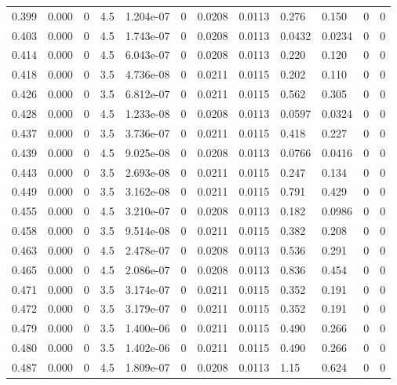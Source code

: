 \documentclass[preview]{standalone}
\begin{document}
{{{\begin{tabular}{L{1.2cm}C{1.2cm} C{0.3cm}C{0.5cm} C{1.4cm}C{1.4cm} C{1.4cm}C{1.4cm} C{1.6cm}C{1.6cm} C{1.6cm}C{1.6cm}}
  0.399  &  0.000  & 0     & 4.5 &  1.204e-07  & 0  &  0.0208&   0.0113& 0.276 & 0.150   &  0 & 0  \\ 
  0.403  &  0.000  & 0     & 4.5 &  1.743e-07  & 0  &  0.0208&   0.0113& 0.0432 & 0.0234   &  0 & 0  \\ 
  0.414  &  0.000  & 0     & 4.5 &  6.043e-07  & 0  &  0.0208&   0.0113& 0.220 & 0.120   &  0 & 0  \\ 
  0.418  &  0.000  & 0     & 3.5 &  4.736e-08  & 0  &  0.0211&   0.0115& 0.202 & 0.110   &  0 & 0  \\ 
  0.426  &  0.000  & 0     & 3.5 &  6.812e-07  & 0  &  0.0211&   0.0115& 0.562 & 0.305   &  0 & 0  \\ 
  0.428  &  0.000  & 0     & 4.5 &  1.233e-08  & 0  &  0.0208&   0.0113& 0.0597 & 0.0324   &  0 & 0  \\ 
  0.437  &  0.000  & 0     & 3.5 &  3.736e-07  & 0  &  0.0211&   0.0115& 0.418 & 0.227   &  0 & 0  \\ 
  0.439  &  0.000  & 0     & 4.5 &  9.025e-08  & 0  &  0.0208&   0.0113& 0.0766 & 0.0416   &  0 & 0  \\ 
  0.443  &  0.000  & 0     & 3.5 &  2.693e-08  & 0  &  0.0211&   0.0115& 0.247 & 0.134   &  0 & 0  \\ 
  0.449  &  0.000  & 0     & 3.5 &  3.162e-08  & 0  &  0.0211&   0.0115& 0.791 & 0.429   &  0 & 0  \\ 
  0.455  &  0.000  & 0     & 4.5 &  3.210e-07  & 0  &  0.0208&   0.0113& 0.182 & 0.0986   &  0 & 0  \\ 
  0.458  &  0.000  & 0     & 3.5 &  9.514e-08  & 0  &  0.0211&   0.0115& 0.382 & 0.208   &  0 & 0  \\ 
  0.463  &  0.000  & 0     & 4.5 &  2.478e-07  & 0  &  0.0208&   0.0113& 0.536 & 0.291   &  0 & 0  \\ 
  0.465  &  0.000  & 0     & 4.5 &  2.086e-07  & 0  &  0.0208&   0.0113& 0.836 & 0.454   &  0 & 0  \\ 
  0.471  &  0.000  & 0     & 3.5 &  3.174e-07  & 0  &  0.0211&   0.0115& 0.352 & 0.191   &  0 & 0  \\ 
  0.472  &  0.000  & 0     & 3.5 &  3.179e-07  & 0  &  0.0211&   0.0115& 0.352 & 0.191   &  0 & 0  \\ 
  0.479  &  0.000  & 0     & 3.5 &  1.400e-06  & 0  &  0.0211&   0.0115& 0.490 & 0.266   &  0 & 0  \\ 
  0.480  &  0.000  & 0     & 3.5 &  1.402e-06  & 0  &  0.0211&   0.0115& 0.490 & 0.266   &  0 & 0  \\ 
  0.487  &  0.000  & 0     & 4.5 &  1.809e-07  & 0  &  0.0208&   0.0113& 1.15 & 0.624   &  0 & 0  \\ 

\end{tabular}}}}
\end{document}
